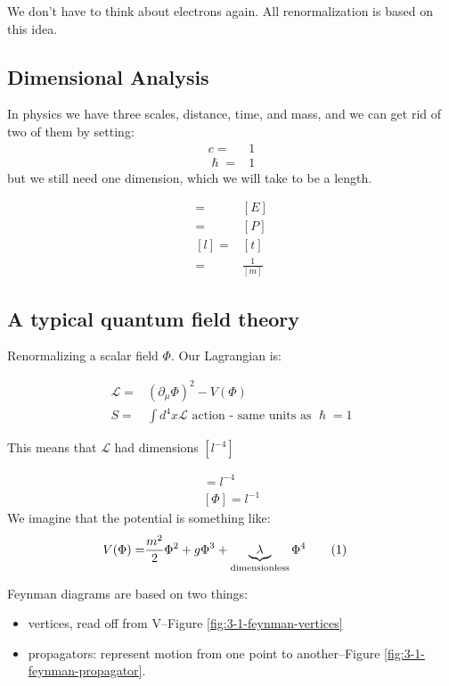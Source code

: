\documentclass[]{article}
\newcommand\numberthis{\addtocounter{equation}{1}\tag{\theequation}}
\begin{document}
We don't have to think about electrons again. All renormalization is based on this idea. 

\subsection{Dimensional Analysis}

In physics we have three scales, distance, time, and mass, and we can get rid of two of them by setting:
\begin{align*}
	c=&1\\
	\hslash=& 1
\end{align*} 
but we still need one dimension, which we will take to be a length.

\begin{align*}
	[m] =& [E]\\
	=& [P]\\
	[l] =& [t]\\
	=& \frac{1}{[m]}
\end{align*}

\subsection{A typical quantum field theory}

Renormalizing a scalar field $\Phi$. Our Lagrangian is:

\begin{align*}
	\mathcal{L} =& (\partial_\mu \Phi)^2 - V(\Phi)\\
	S =& \int d^4 x \mathcal{L} \text{ action - same units as $\hslash=1$}
\end{align*}

This means that $\mathcal{L}$ had dimensions $[l^{-4}]$

\begin{align*}
	[(\frac{\partial \Phi}{\partial x})^2]=l^{-4}\\
	[\Phi] = l^{-1}
\end{align*}
We imagine that the potential is something like:
\begin{align*}
	V(\Phi) =& \frac{m^2}{2} \Phi^2 + g \Phi^3 + \underbrace{\lambda}_\text{dimensionless} \Phi^4 \numberthis \label{eq:potential}
\end{align*}

Feynman diagrams are based on two things:
\begin{itemize}
	\item vertices, read off from V--Figure \ref{fig:3-1-feynman-vertices}
	\item propagators: represent motion from one point to another--Figure \ref{fig:3-1-feynman-propagator}.
\end{itemize}
\end{document}
